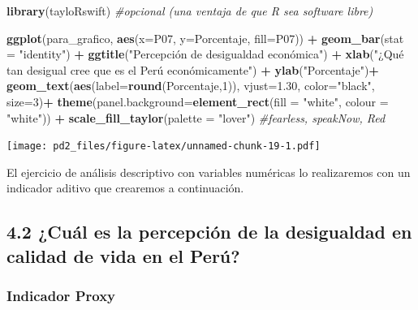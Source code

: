 \documentclass[
]{article}
\newenvironment{Shaded}{\begin{snugshade}}{\end{snugshade}}
\newcommand{\AttributeTok}[1]{\textcolor[rgb]{0.13,0.29,0.53}{#1}}
\newcommand{\CommentTok}[1]{\textcolor[rgb]{0.56,0.35,0.01}{\textit{#1}}}
\newcommand{\DecValTok}[1]{\textcolor[rgb]{0.00,0.00,0.81}{#1}}
\newcommand{\FloatTok}[1]{\textcolor[rgb]{0.00,0.00,0.81}{#1}}
\newcommand{\FunctionTok}[1]{\textcolor[rgb]{0.13,0.29,0.53}{\textbf{#1}}}
\newcommand{\NormalTok}[1]{#1}
\newcommand{\SpecialCharTok}[1]{\textcolor[rgb]{0.81,0.36,0.00}{\textbf{#1}}}
\newcommand{\StringTok}[1]{\textcolor[rgb]{0.31,0.60,0.02}{#1}}
\begin{document}
\begin{Shaded}
\begin{Highlighting}[]
\FunctionTok{library}\NormalTok{(tayloRswift) }\CommentTok{\#opcional (una ventaja de que R sea software libre)}

\FunctionTok{ggplot}\NormalTok{(para\_grafico, }\FunctionTok{aes}\NormalTok{(}\AttributeTok{x=}\NormalTok{P07, }\AttributeTok{y=}\NormalTok{Porcentaje, }\AttributeTok{fill=}\NormalTok{P07)) }\SpecialCharTok{+} 
  \FunctionTok{geom\_bar}\NormalTok{(}\AttributeTok{stat =} \StringTok{"identity"}\NormalTok{)  }\SpecialCharTok{+}
  \FunctionTok{ggtitle}\NormalTok{(}\StringTok{"Percepción de desigualdad económica"}\NormalTok{) }\SpecialCharTok{+}
  \FunctionTok{xlab}\NormalTok{(}\StringTok{"¿Qué tan desigual cree que es el Perú económicamente"}\NormalTok{) }\SpecialCharTok{+} \FunctionTok{ylab}\NormalTok{(}\StringTok{"Porcentaje"}\NormalTok{)}\SpecialCharTok{+}
  \FunctionTok{geom\_text}\NormalTok{(}\FunctionTok{aes}\NormalTok{(}\AttributeTok{label=}\FunctionTok{round}\NormalTok{(Porcentaje,}\DecValTok{1}\NormalTok{)), }\AttributeTok{vjust=}\FloatTok{1.30}\NormalTok{, }\AttributeTok{color=}\StringTok{"black"}\NormalTok{, }\AttributeTok{size=}\DecValTok{3}\NormalTok{)}\SpecialCharTok{+}
  \FunctionTok{theme}\NormalTok{(}\AttributeTok{panel.background=}\FunctionTok{element\_rect}\NormalTok{(}\AttributeTok{fill =} \StringTok{"white"}\NormalTok{, }\AttributeTok{colour =} \StringTok{"white"}\NormalTok{)) }\SpecialCharTok{+}
  \FunctionTok{scale\_fill\_taylor}\NormalTok{(}\AttributeTok{palette =} \StringTok{"lover"}\NormalTok{) }\CommentTok{\#fearless, speakNow, Red}
\end{Highlighting}
\end{Shaded}

\texttt{[image: pd2\_files/figure-latex/unnamed-chunk-19-1.pdf]}

El ejercicio de análisis descriptivo con variables numéricas lo
realizaremos con un indicador aditivo que crearemos a continuación.

\hypertarget{cuuxe1l-es-la-percepciuxf3n-de-la-desigualdad-en-calidad-de-vida-en-el-peruxfa}{%
\subsection{4.2 ¿Cuál es la percepción de la desigualdad en calidad de
vida en el
Perú?}\label{cuuxe1l-es-la-percepciuxf3n-de-la-desigualdad-en-calidad-de-vida-en-el-peruxfa}}

\hypertarget{indicador-proxy}{%
\subsubsection{\texorpdfstring{\textbf{Indicador
Proxy}}{Indicador Proxy}}\label{indicador-proxy}}
\end{document}
